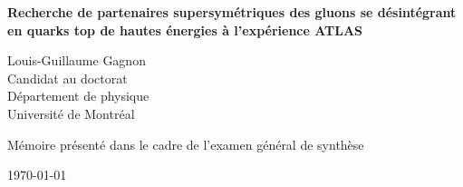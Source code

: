 \thispagestyle{empty}
\begin{center}
\begin{minipage}{0.75\linewidth}
    \centering
    \vspace{3cm}
    
    {\bf {\Large Recherche de partenaires supersymétriques des gluons se
        désintégrant en quarks top de hautes énergies à l'expérience ATLAS \\ }}
    \vspace{3cm}

    {{\Large Louis-Guillaume Gagnon}\\Candidat au doctorat\\
      Département de physique\\ Université de Montréal\par}
    \vspace{3cm}

    {\Large Mémoire présenté dans le cadre de l'examen général de synthèse\\}
    \vspace{4cm}

    {\Large \today}
\end{minipage}
\end{center}
\clearpage\mbox{}\clearpage
